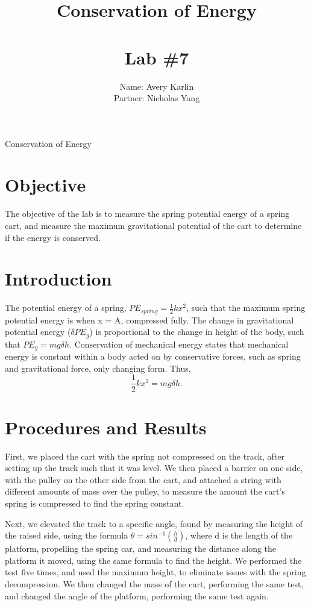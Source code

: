 \documentclass[11pt, titlepage]{article}
\title{Conservation of Energy\\ \ \\ \large Lab \#7}
\author{Name: Avery Karlin \\ Partner: Nicholas Yang}
\date{}
\begin{document}
\maketitle

\begin{center}
\LARGE Conservation of Energy
\end{center}

\section*{Objective}
The objective of the lab is to measure the spring potential energy of a spring cart, and measure the maximum gravitational potential of the cart to determine if the energy is conserved.

\section*{Introduction}
The potential energy of a spring, $PE_{spring} = \frac{1}{2}kx^2$, such that the maximum spring potential energy is when x = A, compressed fully. The change in gravitational potential energy ($\delta PE_{g}$) is proportional to the change in height of the body, such that $PE_{g} = mg\delta h$. Conservation of mechanical energy states that mechanical energy is constant within a body acted on by conservative forces, such as spring and gravitational force, only changing form. Thus, $$\frac{1}{2}kx^2 = mg\delta h.$$

\section*{Procedures and Results}
First, we placed the cart with the spring not compressed on the track, after setting up the track such that it was level. We then placed a barrier on one side, with the pulley on the other side from the cart, and attached a string with different amounts of mass over the pulley, to measure the amount the cart's spring is compressed to find the spring constant.

Next, we elevated the track to a specific angle, found by measuring the height of the raised side, using the formula $\theta = sin^{-1}(\frac{h}{d})$, where d is the length of the platform, propelling the spring car, and measuring the distance along the platform it moved, using the same formula to find the height. We performed the test five times, and used the maximum height, to eliminate issues with the spring decompression. We then changed the mass of the cart, performing the same test, and changed the angle of the platform, performing the same test again.
\end{document}
